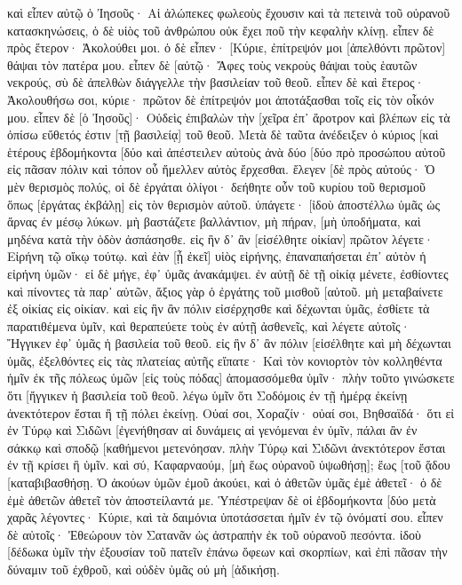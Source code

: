 καὶ εἶπεν αὐτῷ ὁ Ἰησοῦς· Αἱ ἀλώπεκες φωλεοὺς ἔχουσιν καὶ τὰ πετεινὰ τοῦ οὐρανοῦ κατασκηνώσεις, ὁ δὲ υἱὸς τοῦ ἀνθρώπου οὐκ ἔχει ποῦ τὴν κεφαλὴν κλίνῃ. 
εἶπεν δὲ πρὸς ἕτερον· Ἀκολούθει μοι. ὁ δὲ εἶπεν· [Κύριε, ἐπίτρεψόν μοι [ἀπελθόντι πρῶτον] θάψαι τὸν πατέρα μου. 
εἶπεν δὲ [αὐτῷ· Ἄφες τοὺς νεκροὺς θάψαι τοὺς ἑαυτῶν νεκρούς, σὺ δὲ ἀπελθὼν διάγγελλε τὴν βασιλείαν τοῦ θεοῦ. 
εἶπεν δὲ καὶ ἕτερος· Ἀκολουθήσω σοι, κύριε· πρῶτον δὲ ἐπίτρεψόν μοι ἀποτάξασθαι τοῖς εἰς τὸν οἶκόν μου. 
εἶπεν δὲ [ὁ Ἰησοῦς]· Οὐδεὶς ἐπιβαλὼν τὴν [χεῖρα ἐπ᾽ ἄροτρον καὶ βλέπων εἰς τὰ ὀπίσω εὔθετός ἐστιν [τῇ βασιλείᾳ] τοῦ θεοῦ. 
Μετὰ δὲ ταῦτα ἀνέδειξεν ὁ κύριος [καὶ ἑτέρους ἑβδομήκοντα [δύο καὶ ἀπέστειλεν αὐτοὺς ἀνὰ δύο [δύο πρὸ προσώπου αὐτοῦ εἰς πᾶσαν πόλιν καὶ τόπον οὗ ἤμελλεν αὐτὸς ἔρχεσθαι. 
ἔλεγεν [δὲ πρὸς αὐτούς· Ὁ μὲν θερισμὸς πολύς, οἱ δὲ ἐργάται ὀλίγοι· δεήθητε οὖν τοῦ κυρίου τοῦ θερισμοῦ ὅπως [ἐργάτας ἐκβάλῃ] εἰς τὸν θερισμὸν αὐτοῦ. 
ὑπάγετε· [ἰδοὺ ἀποστέλλω ὑμᾶς ὡς ἄρνας ἐν μέσῳ λύκων. 
μὴ βαστάζετε βαλλάντιον, μὴ πήραν, [μὴ ὑποδήματα, καὶ μηδένα κατὰ τὴν ὁδὸν ἀσπάσησθε. 
εἰς ἣν δ᾽ ἂν [εἰσέλθητε οἰκίαν] πρῶτον λέγετε· Εἰρήνη τῷ οἴκῳ τούτῳ. 
καὶ ἐὰν [ᾖ ἐκεῖ] υἱὸς εἰρήνης, ἐπαναπαήσεται ἐπ᾽ αὐτὸν ἡ εἰρήνη ὑμῶν· εἰ δὲ μήγε, ἐφ᾽ ὑμᾶς ἀνακάμψει. 
ἐν αὐτῇ δὲ τῇ οἰκίᾳ μένετε, ἐσθίοντες καὶ πίνοντες τὰ παρ᾽ αὐτῶν, ἄξιος γὰρ ὁ ἐργάτης τοῦ μισθοῦ [αὐτοῦ. μὴ μεταβαίνετε ἐξ οἰκίας εἰς οἰκίαν. 
καὶ εἰς ἣν ἂν πόλιν εἰσέρχησθε καὶ δέχωνται ὑμᾶς, ἐσθίετε τὰ παρατιθέμενα ὑμῖν, 
καὶ θεραπεύετε τοὺς ἐν αὐτῇ ἀσθενεῖς, καὶ λέγετε αὐτοῖς· Ἤγγικεν ἐφ᾽ ὑμᾶς ἡ βασιλεία τοῦ θεοῦ. 
εἰς ἣν δ᾽ ἂν πόλιν [εἰσέλθητε καὶ μὴ δέχωνται ὑμᾶς, ἐξελθόντες εἰς τὰς πλατείας αὐτῆς εἴπατε· 
Καὶ τὸν κονιορτὸν τὸν κολληθέντα ἡμῖν ἐκ τῆς πόλεως ὑμῶν [εἰς τοὺς πόδας] ἀπομασσόμεθα ὑμῖν· πλὴν τοῦτο γινώσκετε ὅτι [ἤγγικεν ἡ βασιλεία τοῦ θεοῦ. 
λέγω ὑμῖν ὅτι Σοδόμοις ἐν τῇ ἡμέρᾳ ἐκείνῃ ἀνεκτότερον ἔσται ἢ τῇ πόλει ἐκείνῃ. 
Οὐαί σοι, Χοραζίν· οὐαί σοι, Βηθσαϊδά· ὅτι εἰ ἐν Τύρῳ καὶ Σιδῶνι [ἐγενήθησαν αἱ δυνάμεις αἱ γενόμεναι ἐν ὑμῖν, πάλαι ἂν ἐν σάκκῳ καὶ σποδῷ [καθήμενοι μετενόησαν. 
πλὴν Τύρῳ καὶ Σιδῶνι ἀνεκτότερον ἔσται ἐν τῇ κρίσει ἢ ὑμῖν. 
καὶ σύ, Καφαρναούμ, [μὴ ἕως οὐρανοῦ ὑψωθήσῃ]; ἕως [τοῦ ᾅδου [καταβιβασθήσῃ. 
Ὁ ἀκούων ὑμῶν ἐμοῦ ἀκούει, καὶ ὁ ἀθετῶν ὑμᾶς ἐμὲ ἀθετεῖ· ὁ δὲ ἐμὲ ἀθετῶν ἀθετεῖ τὸν ἀποστείλαντά με. 
Ὑπέστρεψαν δὲ οἱ ἑβδομήκοντα [δύο μετὰ χαρᾶς λέγοντες· Κύριε, καὶ τὰ δαιμόνια ὑποτάσσεται ἡμῖν ἐν τῷ ὀνόματί σου. 
εἶπεν δὲ αὐτοῖς· Ἐθεώρουν τὸν Σατανᾶν ὡς ἀστραπὴν ἐκ τοῦ οὐρανοῦ πεσόντα. 
ἰδοὺ [δέδωκα ὑμῖν τὴν ἐξουσίαν τοῦ πατεῖν ἐπάνω ὄφεων καὶ σκορπίων, καὶ ἐπὶ πᾶσαν τὴν δύναμιν τοῦ ἐχθροῦ, καὶ οὐδὲν ὑμᾶς οὐ μὴ [ἀδικήσῃ. 
